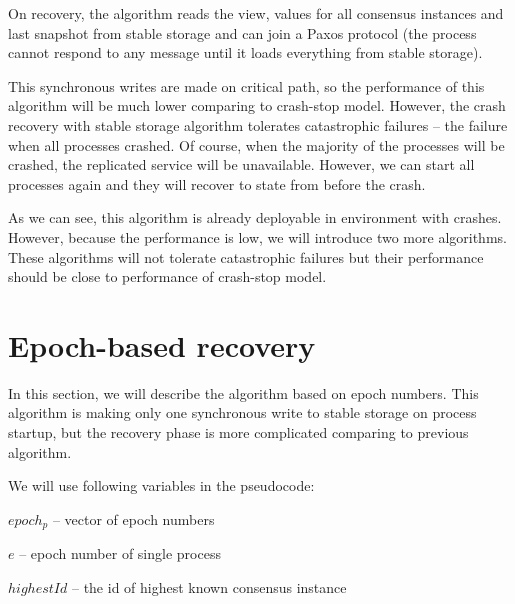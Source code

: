On recovery, the algorithm reads the view, values for all consensus instances and last snapshot from stable storage and can join a Paxos protocol (the process cannot respond to any message until it loads everything from stable storage).

This synchronous writes are made on critical path, so the performance of this algorithm will be much lower comparing to crash-stop model. However, the crash recovery with stable storage algorithm tolerates catastrophic failures -- the failure when all processes crashed. Of course, when the majority of the processes will be crashed, the replicated service will be unavailable. However, we can start all processes again and they will recover to state from before the crash.

As we can see, this algorithm is already deployable in environment with crashes. However, because the performance is low, we will introduce two more algorithms. These algorithms will not tolerate catastrophic failures but their performance should be close to performance of crash-stop model.

\section{Epoch-based recovery}
\label{sec:epoch_ss}

In this section, we will describe the algorithm based on epoch numbers. This algorithm is making only one synchronous write to stable storage on process startup, but the recovery phase is more complicated comparing to previous algorithm.

We will use following variables in the pseudocode:
\begin{tightList}[\setlength{\labelwidth}{20em} \setlength{\leftmargin}{3\leftmargin}]
  \item[$epoch_p$] -- vector of epoch numbers
  \item[$e$] -- epoch number of single process
  \item[$highestId$] -- the id of highest known consensus instance
\end{tightList}

